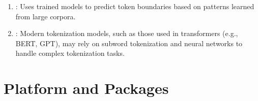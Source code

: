 \documentclass[letterpaper,11pt,english]{sphinxmanual}
\begin{document}
\begin{itemize}
\begin{enumerate}
\item {} 
\sphinxAtStartPar
{}: Uses trained models to predict token boundaries based on patterns learned from large corpora.

\item {} 
\sphinxAtStartPar
{}: Modern tokenization models, such as those used in transformers (e.g., BERT, GPT), may rely on subword tokenization and neural networks to handle complex tokenization tasks.

\end{enumerate}

\end{itemize}


\section{Platform and Packages}
\label{\detokenize{prelim:platform-and-packages}}
\end{document}
